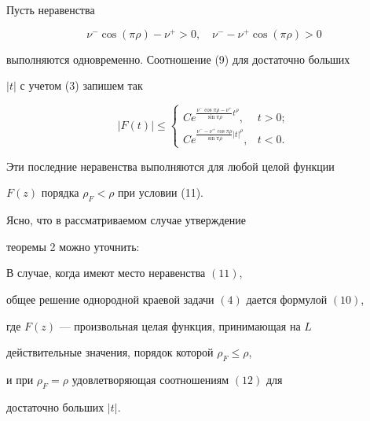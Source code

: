 Пусть неравенства


\begin{equation}


\nu^-\cos(\pi\rho) - \nu^+ >0,\quad\nu^- - \nu^+\cos(\pi\rho) > 0


\end{equation}


выполняются одновременно. Соотношение (9) для достаточно больших


$|t|$ с учетом (3) запишем так


\begin{equation}


{ |F(t)|} \leq\begin{cases}


Ce^{\frac{\nu^-\cos\pi\rho -\nu^+}{\sin\pi\rho}t^\rho}, & t>0; \\


Ce^{\frac{\nu^- -\nu^+\cos\pi\rho}{\sin\pi\rho}|t|^\rho}, & t<0.


\end{cases}


\end{equation}





Эти последние неравенства выполняются для любой целой функции


$F(z)$ порядка $\rho_F < \rho$ при условии (11).





Ясно, что в рассматриваемом случае утверждение


теоремы 2 можно уточнить:





\begin{thm}


В случае, когда имеют место неравенства $(11)$,


общее решение однородной краевой задачи $(4)$ дается формулой $(10)$,


где $F(z)$ --- произвольная целая функция, принимающая на $L$


действительные значения, порядок которой $\rho_F\leq \rho$,


и при $\rho_F= \rho$ удовлетворяющая соотношениям $(12)$ для


достаточно больших $|t|$.


\end{thm}





